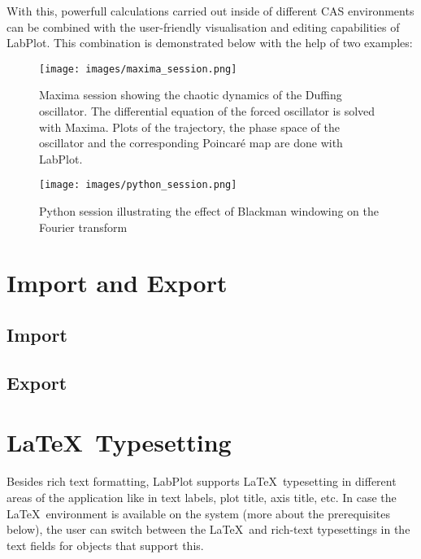 With this, powerfull calculations carried out inside of different CAS environments can be combined with the user-friendly visualisation and editing capabilities of LabPlot. This combination is demonstrated below with the help of two examples:
\begin{figure}
\texttt{[image: images/maxima\_session.png]}
\caption{Maxima session showing the chaotic dynamics of the Duffing oscillator. The differential equation of the forced oscillator is solved with Maxima. Plots of the trajectory, the phase space of the oscillator and the corresponding Poincaré map are done with LabPlot.}
\end{figure}

\begin{figure}
\texttt{[image: images/python\_session.png]}
\caption{Python session illustrating the effect of Blackman windowing on the Fourier transform}
\end{figure}



\chapter{Import and Export}\label{ch:import_export}
\section{Import}\label{sec:import}
\section{Export}\label{sec:export}

\chapter{\LaTeX\, Typesetting}\label{ch:latex_typesetting}
Besides rich text formatting, LabPlot supports \LaTeX\, typesetting in different areas of the application like in text labels, plot title, axis title, etc. In case the \LaTeX\, environment is available on the system (more about the prerequisites below), the user can switch between the \LaTeX\, and rich-text typesettings in the text fields for objects that support this.

